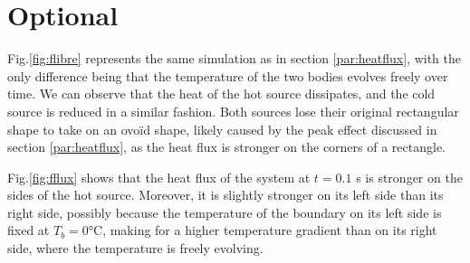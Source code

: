 \documentclass[a4paper,12pt,twoside]{article}
\begin{document}
\section{Optional}
Fig.\ref{fig:flibre} represents the same simulation as in section \ref{par:heatflux}, with the only difference being that the temperature of the two bodies evolves freely over time. We can observe that the heat of the hot source dissipates, and the cold source is reduced in a similar fashion. Both sources lose their original rectangular shape to take on an ovoïd shape, likely caused by the peak effect discussed in section \ref{par:heatflux}, as the heat flux is stronger on the corners of a rectangle.

Fig.\ref{fig:fflux} shows that the heat flux of the system at $t=0.1$ s is stronger on the sides of the hot source. Moreover, it is slightly stronger on its left side than its right side, possibly because the temperature of the boundary on its left side is fixed at $T_b=0$°C, making for a higher temperature gradient than on its right side, where the temperature is freely evolving.
\end{document}
